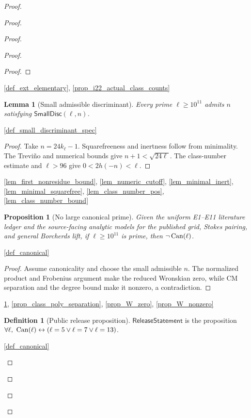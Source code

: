 \documentclass[11pt,a4paper]{article}
\numberwithin{equation}{section}
\theoremstyle{plain}\newtheorem{theorem}{Theorem}[section]\newaliascnt{proposition}{theorem}\newtheorem{proposition}[proposition]{Proposition}\aliascntresetthe{proposition}\newaliascnt{lemma}{theorem}\newtheorem{lemma}[lemma]{Lemma}\aliascntresetthe{lemma}
\theoremstyle{definition}\newaliascnt{definition}{theorem}\newtheorem{definition}[definition]{Definition}\aliascntresetthe{definition}\newaliascnt{notation}{theorem}\newtheorem{notation}[notation]{Notation}\aliascntresetthe{notation}
\providecommand{\lean}[1]{}\providecommand{\leanok}{}
\begin{document}
\begin{proof}
\begin{proof}
\begin{proof}
\begin{proof}
\begin{proof}
\end{proof}
\begin{uses-proof}\ref{def_ext_elementary}, \ref{prop_i22_actual_class_counts}\end{uses-proof}
\begin{lemma}[Small admissible discriminant]\label{lem_small_n}\lean{SptCM.Repair.small_n_of_E10}\leanok
Every prime $\ell\ge10^{11}$ admits $n$ satisfying $\mathsf{SmallDisc}(\ell,n)$.
\end{lemma}
\begin{uses-statement}\ref{def_small_discriminant_spec}\end{uses-statement}
\begin{proof}
Take $n=24k_\ell-1$.  Squarefreeness and inertness follow from minimality.  The Treviño and numerical bounds give $n+1<\sqrt{24\ell}$.  The class-number estimate and $\ell>96$ give $0<2h(-n)<\ell$.
\end{proof}
\begin{uses-proof}\ref{lem_first_nonresidue_bound}, \ref{lem_numeric_cutoff}, \ref{lem_minimal_inert}, \ref{lem_minimal_squarefree}, \ref{lem_class_number_pos}, \ref{lem_class_number_bound}\end{uses-proof}

\begin{proposition}[No large canonical prime]\label{prop_large_exclusion}\lean{SptCM.Repair.large_exclusion_of_uniform_literature}\leanok
Given the uniform E1--E11 literature ledger and the source-facing analytic
models for the published grid, Stokes pairing, and general Borcherds lift, if
$\ell\ge10^{11}$ is prime, then $\neg\operatorname{Can}(\ell)$.
\end{proposition}
\begin{uses-statement}\ref{def_canonical}\end{uses-statement}
\begin{proof}
Assume canonicality and choose the small admissible $n$.  The normalized product and Frobenius argument make the reduced Wronskian zero, while CM separation and the degree bound make it nonzero, a contradiction.
\end{proof}
\begin{uses-proof}\ref{lem_small_n}, \ref{prop_class_poly_separation},
\ref{prop_W_zero}, \ref{prop_W_nonzero}\end{uses-proof}

\begin{definition}[Public release proposition]\label{def_release_statement}\lean{SptCM.Repair.RolenClassificationStatement}\leanok
$\mathsf{ReleaseStatement}$ is the proposition $\forall\ell,\ \Can(\ell)\leftrightarrow(\ell=5\lor\ell=7\lor\ell=13)$.
\end{definition}
\begin{uses-statement}\ref{def_canonical}\end{uses-statement}


\end{proof}
\end{proof}
\end{proof}
\end{proof}
\end{document}
